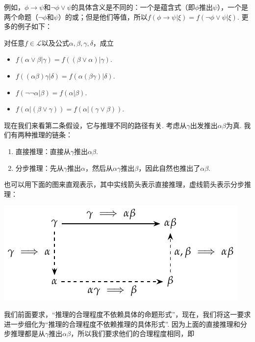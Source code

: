 例如，$\phi\to \psi$和$\neg \phi\vee \psi$的具体含义是不同的：一个是蕴含式（即$\phi$推出$\psi$），一个是两个命题（$\neg \phi$和$\psi$）的或；但是他们等值，所以$f(\phi\to \psi | \xi)=f(\neg \phi\vee \psi|\xi)$. 更多的例子如下：

\begin{example}
    对任意$f\in\mathcal L$以及公式$\alpha,\beta,\gamma,\delta$，成立
    \begin{itemize}
        \item $f(\alpha\vee \beta | \gamma)=f((\beta\vee \alpha) | \gamma)$.
        \item $f((\alpha\beta)\gamma|\delta)=f(\alpha(\beta\gamma)|\delta)$.
        \item $f(\neg\neg \alpha|\beta)=f(\alpha|\beta)$.
        \item $f(\alpha| (\beta \vee \gamma)) = f(\alpha | (\gamma \vee \beta))$.
    \end{itemize}
\end{example}

现在我们来看第二条假设，它与推理不同的路径有关. 考虑从$\gamma$出发推出$\alpha\beta$为真. 我们有两种推理的链条：
\begin{enumerate}
    \item 直接推理：直接从$\gamma$推出$\alpha\beta$.
    \item 分步推理：先从$\gamma$推出$\alpha$，然后从$\alpha\gamma$推出$\beta$，因此自然也推出了$\alpha\beta$.
\end{enumerate}
也可以用下面的图来直观表示，其中实线箭头表示直接推理，虚线箭头表示分步推理：

\begin{center}
\includegraphics{figures/plausible-reasoning/two-chain-reasoning.pdf}
\end{center}

我们前面要求，“推理的合理程度不依赖具体的命题形式”，现在，我们将这一要求进一步细化为“推理的合理程度不依赖推理的具体形式”. 因为上面的直接推理和分步推理都是从$\gamma$推出$\alpha\beta$，所以我们要求他们的合理程度相同，即

